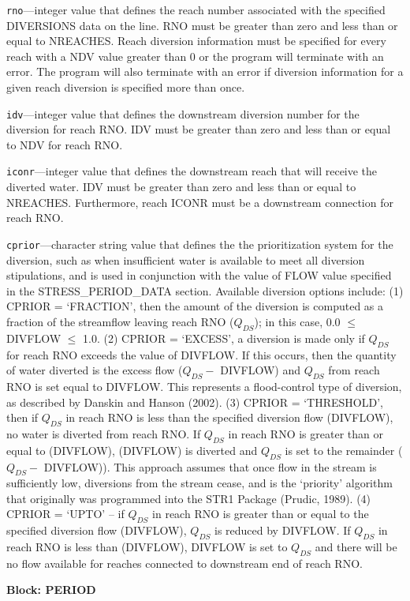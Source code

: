 \begin{description}
\item \texttt{rno}---integer value that defines the reach number associated with the specified DIVERSIONS data on the line. RNO must be greater than zero and less than or equal to NREACHES.  Reach diversion information must be specified for every reach with a NDV value greater than 0 or the program will terminate with an error.  The program will also terminate with an error if diversion information for a given reach diversion is specified more than once.

\item \texttt{idv}---integer value that defines the downstream diversion number for the diversion for reach RNO. IDV must be greater than zero and less than or equal to NDV for reach RNO.

\item \texttt{iconr}---integer value that defines the downstream reach that will receive the diverted water. IDV must be greater than zero and less than or equal to NREACHES. Furthermore, reach  ICONR must be a downstream connection for reach RNO.

\item \texttt{cprior}---character string value that defines the the prioritization system for the diversion, such as when insufficient water is available to meet all diversion stipulations, and is used in conjunction with the value of FLOW value specified in the STRESS\_PERIOD\_DATA section. Available diversion options include:  (1) CPRIOR = `FRACTION', then the amount of the diversion is computed as a fraction of the streamflow leaving reach RNO ($Q_{DS}$); in this case, 0.0 $\le$ DIVFLOW $\le$ 1.0.  (2) CPRIOR = `EXCESS', a diversion is made only if $Q_{DS}$ for reach RNO exceeds the value of DIVFLOW. If this occurs, then the quantity of water diverted is the excess flow ($Q_{DS} -$ DIVFLOW) and $Q_{DS}$ from reach RNO is set equal to DIVFLOW. This represents a flood-control type of diversion, as described by Danskin and Hanson (2002). (3) CPRIOR = `THRESHOLD', then if $Q_{DS}$ in reach RNO is less than the specified diversion flow (DIVFLOW), no water is diverted from reach RNO. If $Q_{DS}$ in reach RNO is greater than or equal to (DIVFLOW), (DIVFLOW) is diverted and $Q_{DS}$ is set to the remainder ($Q_{DS} -$ DIVFLOW)). This approach assumes that once flow in the stream is sufficiently low, diversions from the stream cease, and is the `priority' algorithm that originally was programmed into the STR1 Package (Prudic, 1989).  (4) CPRIOR = `UPTO' -- if $Q_{DS}$ in reach RNO is greater than or equal to the specified diversion flow (DIVFLOW), $Q_{DS}$ is reduced by DIVFLOW. If $Q_{DS}$ in reach RNO is less than (DIVFLOW), DIVFLOW is set to $Q_{DS}$ and there will be no flow available for reaches connected to downstream end of reach RNO.

\end{description}
\item \textbf{Block: PERIOD}

